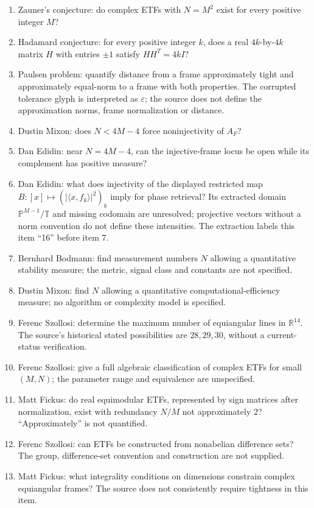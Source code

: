 \documentclass[11pt]{article}
\newcommand{\R}{\mathbb{R}}
\newcommand{\eps}{\varepsilon}
\begin{document}
\begin{enumerate}
\item Zauner's conjecture: do complex ETFs with \(N=M^2\) exist for every positive integer \(M\)?
\item Hadamard conjecture: for every positive integer \(k\), does a real \(4k\)-by-\(4k\) matrix \(H\) with entries \(\pm1\) satisfy \(HH^T=4kI\)?
\item Paulsen problem: quantify distance from a frame approximately tight and approximately equal-norm to a frame with both properties. The corrupted tolerance glyph is interpreted as \(\eps\); the source does not define the approximation norms, frame normalization or distance.
\item Dustin Mixon: does \(N<4M-4\) force noninjectivity of \(A_F\)?
\item Dan Edidin: near \(N=4M-4\), can the injective-frame locus be open while its complement has positive measure?
\item Dan Edidin: what does injectivity of the displayed restricted map \(B:[x]\mapsto(|\langle x,f_k\rangle|^2)_k\) imply for phase retrieval? Its extracted domain \(\mathbb P^{M-1}/\mathbb T\) and missing codomain are unresolved; projective vectors without a norm convention do not define these intensities. The extraction labels this item ``16'' before item \(7\).
\item Bernhard Bodmann: find measurement numbers \(N\) allowing a quantitative stability measure; the metric, signal class and constants are not specified.
\item Dustin Mixon: find \(N\) allowing a quantitative computational-efficiency measure; no algorithm or complexity model is specified.
\item Ferenc Szollosi: determine the maximum number of equiangular lines in \(\R^{14}\). The source's historical stated possibilities are \(28,29,30\), without a current-status verification.
\item Ferenc Szollosi: give a full algebraic classification of complex ETFs for small \((M,N)\); the parameter range and equivalence are unspecified.
\item Matt Fickus: do real equimodular ETFs, represented by sign matrices after normalization, exist with redundancy \(N/M\) not approximately \(2\)? ``Approximately'' is not quantified.
\item Ferenc Szollosi: can ETFs be constructed from nonabelian difference sets? The group, difference-set convention and construction are not supplied.
\item Matt Fickus: what integrality conditions on dimensions constrain complex equiangular frames? The source does not consistently require tightness in this item.

\end{enumerate}
\end{document}

